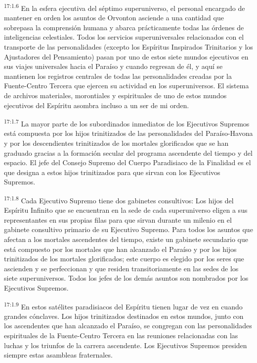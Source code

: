 \par
\textsuperscript{17:1.6} En la esfera ejecutiva del séptimo superuniverso, el personal encargado de mantener en orden los asuntos de Orvonton asciende a una cantidad que sobrepasa la comprensión humana y abarca prácticamente todas las órdenes de inteligencias celestiales. Todos los servicios superuniversales relacionados con el transporte de las personalidades (excepto los Espíritus Inspirados Trinitarios y los Ajustadores del Pensamiento) pasan por uno de estos siete mundos ejecutivos en sus viajes universales hacia el Paraíso y cuando regresan de él, y aquí se mantienen los registros centrales de todas las personalidades creadas por la Fuente-Centro Tercera que ejercen su actividad en los superuniversos. El sistema de archivos materiales, morontiales y espirituales de uno de estos mundos ejecutivos del Espíritu asombra incluso a un ser de mi orden.

\par
\textsuperscript{17:1.7} La mayor parte de los subordinados inmediatos de los Ejecutivos Supremos está compuesta por los hijos trinitizados de las personalidades del Paraíso-Havona y por los descendientes trinitizados de los mortales glorificados que se han graduado gracias a la formación secular del programa ascendente del tiempo y del espacio. El jefe del Consejo Supremo del Cuerpo Paradisiaco de la Finalidad es el que designa a estos hijos trinitizados para que sirvan con los Ejecutivos Supremos.

\par
\textsuperscript{17:1.8} Cada Ejecutivo Supremo tiene dos gabinetes consultivos: Los hijos del Espíritu Infinito que se encuentran en la sede de cada superuniverso eligen a sus representantes en sus propias filas para que sirvan durante un milenio en el gabinete consultivo primario de su Ejecutivo Supremo. Para todos los asuntos que afectan a los mortales ascendentes del tiempo, existe un gabinete secundario que está compuesto por los mortales que han alcanzado el Paraíso y por los hijos trinitizados de los mortales glorificados; este cuerpo es elegido por los seres que ascienden y se perfeccionan y que residen transitoriamente en las sedes de los siete superuniversos. Todos los jefes de los demás asuntos son nombrados por los Ejecutivos Supremos.

\par
\textsuperscript{17:1.9} En estos satélites paradisiacos del Espíritu tienen lugar de vez en cuando grandes cónclaves. Los hijos trinitizados destinados en estos mundos, junto con los ascendentes que han alcanzado el Paraíso, se congregan con las personalidades espirituales de la Fuente-Centro Tercera en las reuniones relacionadas con las luchas y los triunfos de la carrera ascendente. Los Ejecutivos Supremos presiden siempre estas asambleas fraternales.

